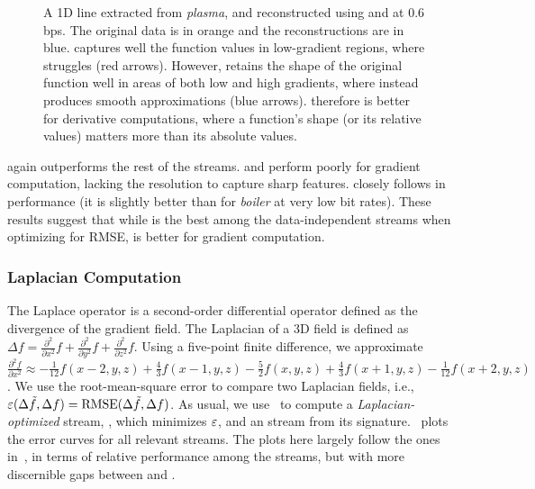 \begin{figure}[!b]
\centering
{} 
\caption{A 1D line extracted from \emph{plasma}, and reconstructed using \sbit and \swav at 0.6 bps.
The original data is in orange and the reconstructions are in blue. \swav captures well the function
values in low-gradient regions, where \sbit struggles (red arrows). However, \sbit retains the shape
of the original function well in areas of both low and high gradients, where \swav instead produces
smooth approximations (blue arrows). \sbit therefore is better for derivative computations, where a
function's shape (or its relative values) matters more than its absolute values.}
\label{fig:bit-plane-vs-wavelet-norm-gradient}
\vspace{-1em}
\end{figure}

\sgop again outperforms the rest of the streams. \slvl and \smag perform poorly for gradient
computation, lacking the resolution to capture sharp features. \sgsg closely follows \sbit in
performance (it is slightly better than \sbit for \emph{boiler} at very low bit rates). These
results suggest that while \swav is the best among the data-independent streams when optimizing for
RMSE, \sbit is better for gradient computation.



\subsubsection{Laplacian Computation}\label{sec:laplacian}

The Laplace operator is a second-order differential operator defined as the divergence of the
gradient field. The Laplacian of a 3D field is defined as $\Delta f = 
\frac{{\partial}^2}{\partial{x^2}}f+\frac{{\partial}^2}{\partial{y^2}}f+\frac{{\partial}^2}{\partial{z^2}}f$.
%
Using a five-point finite difference, we approximate 
$\frac{{\partial}^2 f}{\partial{x^2}}
\approx
-\frac{1}{12}f(x-2,y,z)+\frac{4}{3}f(x-1,y,z)-\frac{5}{2}f(x,y,z)+\frac{4}{3}f(x+1,y,z)-\frac{1}{12}f(x+2,y,z)$.
We use the root-mean-square error to compare two Laplacian fields, i.e., $\err(\Delta
\tilde{f},\Delta f)=\text{RMSE}(\Delta \tilde{f},\Delta f)$. As usual, we use~ to
compute a \emph{Laplacian-optimized} stream, \slop, which minimizes $\err$, and an \slsg stream from
its signature.~ plots the error curves for all relevant
streams. The plots here largely follow the ones in~, in terms of
relative performance among the streams, but with more discernible gaps between \sbit and \slsg.



